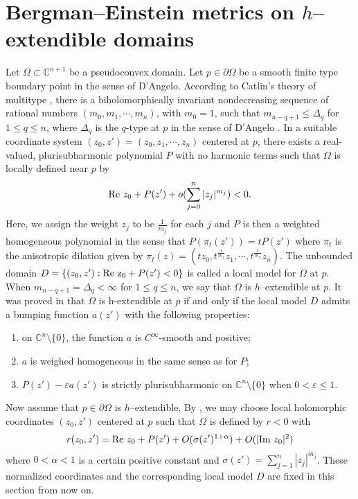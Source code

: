 \documentclass[a4paper,centertags,oneside,12pt]{amsart}
\newcommand{\p}{\partial}
\numberwithin{equation}{section}
\begin{document}
\section{Bergman--Einstein metrics on $h$--extendible domains}
Let $\Omega\subset\mathbb C^{n+1}$ be a  pseudoconvex domain. Let $p\in\partial \Omega$ be a smooth finite type boundary point in the sense of D'Angelo. According to Catlin's theory of multitype \cite{Ca84}, there is a biholomorphically invariant nondecreasing sequence of rational numbers $(m_0, m_1, \cdots, m_n)$, with $m_0=1$, such that $m_{n-q+1}\leq\Delta_q$ for $1\leq q\leq n$, where $\Delta_q$ is the $q$-type at $p$ in the sense of D'Angelo \cite{D82}. In a suitable coordinate system  $(z_0, z')=(z_0, z_1, \cdots, z_n)$ centered at $p$, there exists a real-valued, plurisubharmonic polynomial $P$ with no harmonic terms such that $\Omega$ is locally defined near $p$ by
$${\rm Re}~z_0+P(z')+o(\sum_{j=0}^n|z_j|^{m_j})<0.$$
Here, we assign the weight $z_j$ to be $\frac{1}{m_j}$ for each $j$ and $P$ is then a  weighted homogeneous polynomial  in the sense that  $P(\pi_t(z'))=tP(z')$ where $\pi_t$ is the anisotropic dilation given by
$\pi_t(z)=(tz_0, t^{\frac{1}{m_1}}z_1, \cdots, t^{\frac{1}{m_n}}z_n)$. The unbounded domain $D=\{(z_0, z'):{\rm Re~z_0}+P(z')<0\}$ is called a local model for $\Omega$ at $p$. When $m_{n-q+1}=\Delta_q<\infty$ for $1\leq q\leq n$, we say that $\Omega$ is $h$--extendible at $p$. 
It was proved  in  \cite{ Yu93, Yu94} that $\Omega$ is h-extendible at $p$ if and only if the local model $D$ admits a bumping function $a(z')$ with the following properties:
\begin{enumerate}
    \item on $\mathbb C^n\setminus\{0\}$, the function $a$ is $C^\infty$-smooth and positive;
    \item $a$ is weighed homogeneous in the same sense as for  $P$;
    \item $P(z')-\varepsilon a(z')$ is strictly plurisubharmonic on $\mathbb C^n\setminus\{0\}$ when $0<\varepsilon\leq 1$.
\end{enumerate}
Now assume that $p\in \p\Omega$ is $h$--extendible. By \cite{BSY95, Yu93, Yu94}, we may choose local holomorphic coordinates $(z_0, z')$ centered at $p$ such that $\Omega$ is defined by $r<0$ with $$r(z_0, z')={\rm Re}~z_0+P(z')+O(\sigma(z')^{1+\alpha})+O(|{\rm Im}~z_0|^{2})$$
where $0<\alpha<1$ is a certain  positive constant and $\sigma(z')=\sum_{j=1}^n|z_j|^{m_j}$. 
These normalized coordinates and the corresponding local model $D$ are fixed  in this section from now on.  
\end{document}
